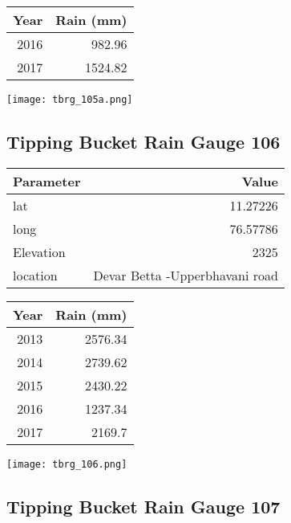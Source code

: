 \documentclass[a4paper]{article}
\begin{document}
\begin{center}
\begin{tabular}{rr}
Year & Rain (mm)\\
\hline
2016 & 982.96\\
2017 & 1524.82\\
\end{tabular}
\end{center}

\begin{center}
\texttt{[image: tbrg\_105a.png]}
\end{center}

\newpage

\subsection*{Tipping Bucket Rain Gauge 106}
\label{sec:org4b4606e}

\begin{center}
\begin{tabular}{lr}
Parameter & Value\\
\hline
lat & 11.27226\\
long & 76.57786\\
Elevation & 2325\\
location & Devar Betta -Upperbhavani road\\
\end{tabular}
\end{center}

\begin{center}
\begin{tabular}{rr}
Year & Rain (mm)\\
\hline
2013 & 2576.34\\
2014 & 2739.62\\
2015 & 2430.22\\
2016 & 1237.34\\
2017 & 2169.7\\
\end{tabular}
\end{center}

\begin{center}
\texttt{[image: tbrg\_106.png]}
\end{center}


\newpage

\subsection*{Tipping Bucket Rain Gauge 107}
\label{sec:orgab23e59}
\end{document}

